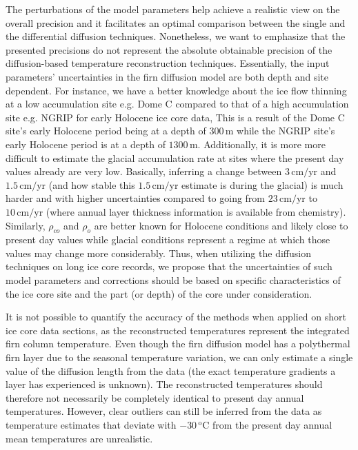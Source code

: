 \documentclass[11pt, draftcls, onecolumn]{IEEEtran} %
\numberwithin{equation}{section}
\numberwithin{table}{section}
\numberwithin{figure}{section}
\begin{document}
The perturbations of the model parameters help achieve a realistic view on the overall precision
and it facilitates an optimal comparison between the single and the differential diffusion techniques.
Nonetheless, we want to emphasize that the presented precisions do not represent the absolute obtainable precision 
of the diffusion-based temperature reconstruction techniques. 
Essentially, the input parameters' uncertainties in the firn diffusion model 
are both depth and site dependent. 
For instance, we have a better knowledge about the ice flow thinning at a low accumulation site e.g. Dome C 
compared to that of a high accumulation site e.g. NGRIP for early Holocene ice core data,
This is a result of the Dome C site's early Holocene period being at a depth of $300\,\mathrm{m}$ while the NGRIP site's
early Holocene period is at a depth of $1300\,\mathrm{m}$. 
Additionally, it is more more difficult to estimate the glacial accumulation rate at sites where the
present day values already are very low.
Basically, inferring a change 
between $3\,\mathrm{cm/yr}$ and $1.5\,\mathrm{cm/yr}$ (and how stable this $1.5\,\mathrm{cm/yr}$ estimate is during the glacial) 
is much harder and with higher uncertainties compared to going from $23\,\mathrm{cm/yr}$ to $10\,\mathrm{cm/yr}$
(where annual layer thickness information is available from chemistry).
Similarly, $\rho_{co}$ and $\rho_o$ are better known for Holocene conditions and likely close to present day
values while glacial conditions represent a regime at which those values may change more considerably.
Thus, when utilizing the diffusion techniques on long ice core records,
we propose that the uncertainties of such model parameters and corrections should be
based on specific characteristics of the ice core site and the part (or depth) of the core under consideration.


It is not possible to quantify the accuracy of the methods when applied on short ice core data sections,
as the reconstructed temperatures represent the integrated firn column temperature.
Even though the firn diffusion model has a polythermal firn layer due to the seasonal temperature variation,
we can only estimate a single value of the diffusion length from the data
(the exact temperature gradients a layer has experienced is unknown).
The reconstructed temperatures should therefore not necessarily be completely identical to present day annual temperatures.
However, clear outliers can still be inferred from the data as temperature estimates that deviate with
$-30\,^\mathrm{o}\mathrm{C}$ from the present day annual mean temperatures are unrealistic.
\end{document}
